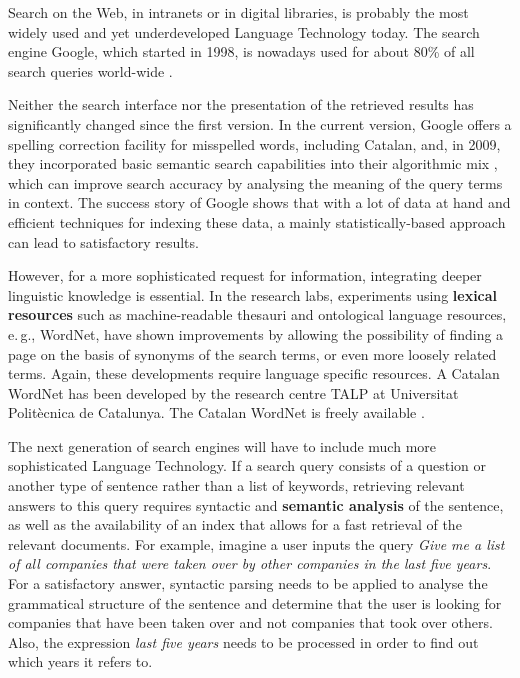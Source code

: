 \begin{multicols}{2}
Search on the Web, in intranets or in digital libraries, is probably the most widely used and yet underdeveloped Language Technology today. The search engine Google, which started in 1998, is nowadays used for about 80\% of all search queries world-wide \cite{CAT-Nota22}. 

Neither the search interface nor the presentation of the retrieved results has significantly changed since the first version. In the current version, Google offers a spelling correction facility for misspelled words, including Catalan, and, in 2009, they incorporated basic semantic search capabilities into their algorithmic mix \cite{CAT-Nota23}, which can improve search accuracy by analysing the meaning of the query terms in context. The success story of Google shows that with a lot of data at hand and efficient techniques for indexing these data, a mainly statistically-based approach can lead to satisfactory results. 

However, for a more sophisticated request for information, integrating deeper linguistic knowledge is essential. In the research labs, experiments using \textbf{lexical resources} such as machine-readable thesauri and ontological language resources, e.\,g., WordNet, have shown improvements by allowing the possibility of finding a page on the basis of synonyms of the search terms, or even more loosely related terms. Again, these developments require language specific resources. A Catalan WordNet has been developed by the research centre TALP at Universitat Politècnica de Catalunya. The Catalan WordNet is freely available \cite{CAT-Nota24}.


The next generation of search engines will have to include much more sophisticated Language Technology. If a search query consists of a question or another type of sentence rather than a list of keywords, retrieving relevant answers to this query requires syntactic and \textbf{semantic analysis} of the sentence, as well as the availability of an index that allows for a fast retrieval of the relevant documents. For example, imagine a user inputs the query \textit{Give me a list of all companies that were taken over by other companies in the last five years}. For a satisfactory answer, syntactic parsing needs to be applied to analyse the grammatical structure of the sentence and determine that the user is looking for companies that have been taken over and not companies that took over others. Also, the expression \textit{last five years} needs to be processed in order to find out which years it refers to. 



\end{multicols}
